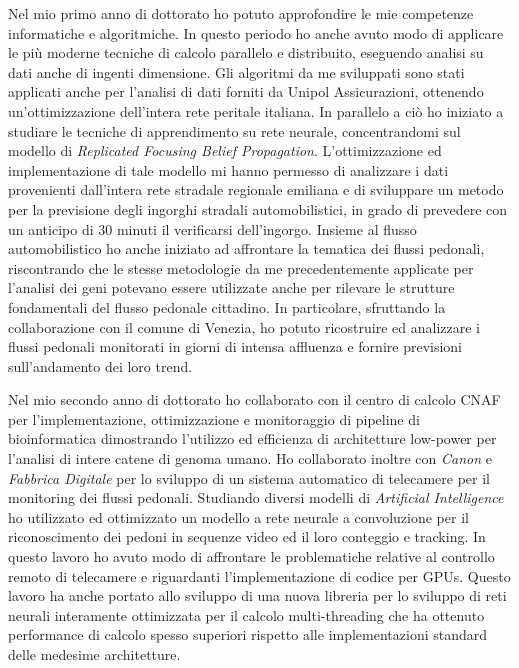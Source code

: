 \documentclass[a4paper,11pt]{article}
\begin{document}
Nel mio primo anno di dottorato ho potuto approfondire le mie competenze informatiche e algoritmiche.
In questo periodo ho anche avuto modo di applicare le più moderne tecniche di calcolo parallelo e distribuito, eseguendo analisi su dati anche di ingenti dimensione.
Gli algoritmi da me sviluppati sono stati applicati anche per l'analisi di dati forniti da Unipol Assicurazioni, ottenendo un'ottimizzazione dell'intera rete peritale italiana.
In parallelo a ciò ho iniziato a studiare le tecniche di apprendimento su rete neurale, concentrandomi sul modello di \emph{Replicated Focusing Belief Propagation}.
L'ottimizzazione ed implementazione di tale modello mi hanno permesso di analizzare i dati provenienti dall'intera rete stradale regionale emiliana e di sviluppare un metodo per la previsione degli ingorghi stradali automobilistici, in grado di prevedere con un anticipo di 30 minuti il verificarsi dell'ingorgo.
Insieme al flusso automobilistico ho anche iniziato ad affrontare la tematica dei flussi pedonali, riscontrando che le stesse metodologie da me precedentemente applicate per l'analisi dei geni potevano essere utilizzate anche per rilevare le strutture fondamentali del flusso pedonale cittadino.
In particolare, sfruttando la collaborazione con il comune di Venezia, ho potuto ricostruire ed analizzare i flussi pedonali monitorati in giorni di intensa affluenza e fornire previsioni sull'andamento dei loro trend.

Nel mio secondo anno di dottorato ho collaborato con il centro di calcolo CNAF per l'implementazione, ottimizzazione e monitoraggio di pipeline di bioinformatica dimostrando l'utilizzo ed efficienza di architetture low-power per l'analisi di intere catene di genoma umano.
Ho collaborato inoltre con \emph{Canon} e \emph{Fabbrica Digitale} per lo sviluppo di un sistema automatico di telecamere per il monitoring dei flussi pedonali.
Studiando diversi modelli di \emph{Artificial Intelligence} ho utilizzato ed ottimizzato un modello a rete neurale a convoluzione per il riconoscimento dei pedoni in sequenze video ed il loro conteggio e tracking.
In questo lavoro ho avuto modo di affrontare le problematiche relative al controllo remoto di telecamere e riguardanti l'implementazione di codice per GPUs.
Questo lavoro ha anche portato allo sviluppo di una nuova libreria per lo sviluppo di reti neurali interamente ottimizzata per il calcolo multi-threading che ha ottenuto performance di calcolo spesso superiori rispetto alle implementazioni standard delle medesime architetture.
\end{document}
